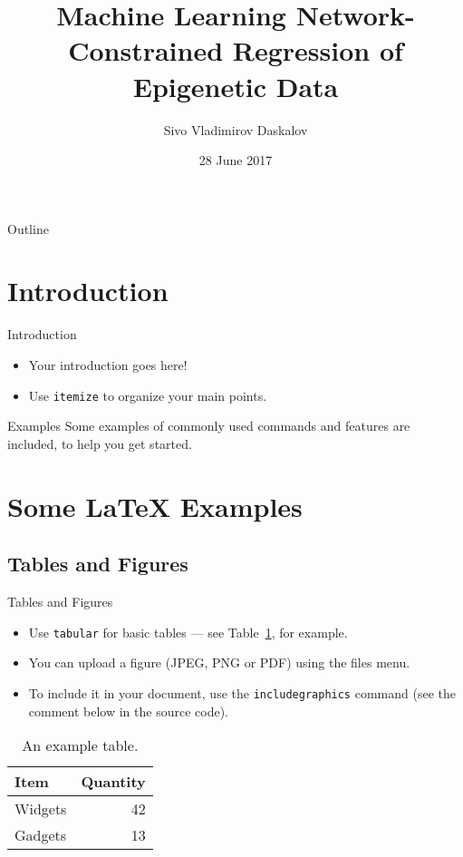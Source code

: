 \documentclass{beamer}
\title{Machine Learning Network-Constrained Regression of Epigenetic Data}
\author{Sivo Vladimirov Daskalov}
\institute{Corpus Christi College}
\date{28 June 2017}
\begin{document}
	
\begin{frame}
	\titlepage
\end{frame}

\begin{frame}{Outline}
  \tableofcontents
\end{frame}

\section{Introduction}

\begin{frame}{Introduction}

\begin{itemize}
	\item Your introduction goes here!
	\item Use \texttt{itemize} to organize your main points.
\end{itemize}

\vskip 1cm

\begin{block}{Examples}
	Some examples of commonly used commands and features are included, to help you get started.
\end{block}

\end{frame}

\section{Some \LaTeX{} Examples}

\subsection{Tables and Figures}

\begin{frame}{Tables and Figures}

\begin{itemize}
\item Use \texttt{tabular} for basic tables --- see Table~\ref{tab:widgets}, for example.
\item You can upload a figure (JPEG, PNG or PDF) using the files menu. 
\item To include it in your document, use the \texttt{includegraphics} command (see the comment below in the source code).
\end{itemize}


\begin{table}
\centering
\begin{tabular}{l|r}
	Item & Quantity \\\hline
	Widgets & 42 \\
	Gadgets & 13
\end{tabular}
\caption{\label{tab:widgets}An example table.}
\end{table}

\end{frame}
\end{document}
